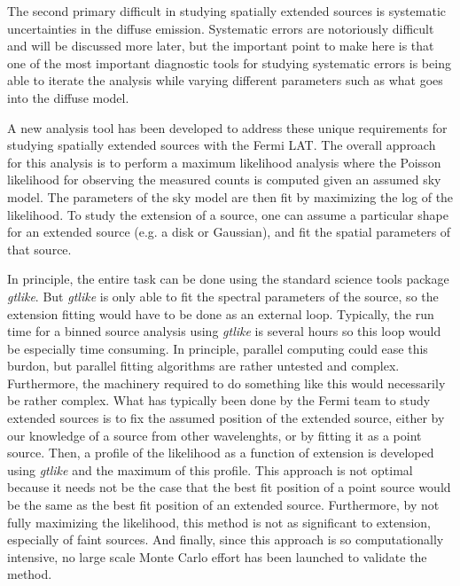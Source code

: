\documentclass[12pt]{article}
\begin{document}
The second primary difficult in studying spatially extended sources is
systematic uncertainties in the diffuse emission. Systematic errors are
notoriously difficult and will be discussed more later, but the important
point to make here is that one of the most important diagnostic tools for
studying systematic errors is being able to iterate the analysis while
varying different parameters such as what goes into the diffuse model.

A new analysis tool has been developed to address these unique
requirements for studying spatially extended sources with the Fermi
LAT. The overall approach for this analysis is to perform a maximum
likelihood analysis where the Poisson likelihood for observing the
measured counts is computed given an assumed sky model. The parameters
of the sky model are then fit by maximizing the log of the likelihood.
To study the extension of a source, one can assume a particular shape
for an extended source (e.g. a disk or Gaussian), and fit the spatial
parameters of that source.

In principle, the entire task can be done using the standard science
tools package {\em gtlike}\cite{Science-Tools-gtlike}. But {\em gtlike} is
only able to fit the spectral parameters of the source, so the extension
fitting would have to be done as an external loop. Typically, the run time
for a binned source analysis using {\em gtlike} is several hours so this loop
would be especially time consuming. In principle, parallel computing could
ease this burdon, but parallel fitting algorithms are rather untested
and complex. Furthermore, the machinery required to do something like
this would necessarily be rather complex. What has typically been done by
the Fermi team to study extended sources is to fix the assumed position
of the extended source, either by our knowledge of a source from other
wavelenghts, or by fitting it as a point source. Then, a profile of the
likelihood as a function of extension is developed using {\em gtlike}
and the maximum of this profile. This approach is not optimal because it
needs not be the case that the best fit position of a point source would
be the same as the best fit position of an extended source. Furthermore,
by not fully maximizing the likelihood, this method is not as significant to
extension, especially of faint sources. And finally, since this approach
is so computationally intensive, no large scale Monte Carlo effort has been
launched to validate the method.
\end{document}
